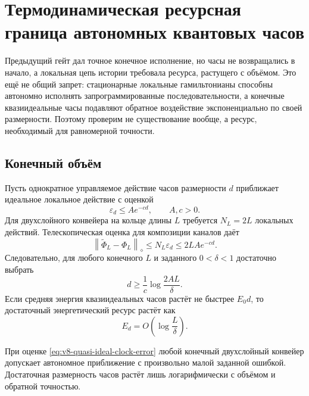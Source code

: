 \chapter{Термодинамическая ресурсная граница автономных квантовых часов}
\label{ch:v8-bounded-strength-autonomous-clock-thermodynamic-limit-gate}

Предыдущий гейт дал точное конечное исполнение, но часы не возвращались в
начало, а локальная цепь истории требовала ресурса, растущего с объёмом.
Это ещё не общий запрет: стационарные локальные гамильтонианы способны
автономно исполнять запрограммированные последовательности, а конечные
квазиидеальные часы подавляют обратное воздействие экспоненциально по своей
размерности. Поэтому проверим не существование вообще, а ресурс, необходимый
для равномерной точности.

\section{Конечный объём}

Пусть однократное управляемое действие часов размерности $d$ приближает
идеальное локальное действие с оценкой
\begin{equation}
 \varepsilon_d\leq A e^{-cd},\qquad A,c>0.
 \label{eq:v8-quasi-ideal-clock-error}
\end{equation}
Для двухслойного конвейера на кольце длины $L$ требуется $N_L=2L$
локальных действий. Телескопическая оценка для композиции каналов даёт
\begin{equation}
 \left\|\widetilde\Phi_L-\Phi_L\right\|_\diamond
 \leq N_L\varepsilon_d
 \leq 2LAe^{-cd}.
 \label{eq:v8-clock-global-error}
\end{equation}
Следовательно, для любого конечного $L$ и заданного $0<\delta<1$ достаточно
выбрать
\begin{equation}
 d\geq \frac1c\log\frac{2AL}{\delta}.
 \label{eq:v8-clock-dimension-schedule}
\end{equation}
Если средняя энергия квазиидеальных часов растёт не быстрее $E_0d$, то
достаточный энергетический ресурс растёт как
\begin{equation}
 E_d=O\!\left(\log\frac{L}{\delta}\right).
 \label{eq:v8-clock-energy-schedule}
\end{equation}

\begin{theorem}
При оценке \eqref{eq:v8-quasi-ideal-clock-error} любой конечный
двухслойный конвейер допускает автономное приближение с произвольно малой
заданной ошибкой. Достаточная размерность часов растёт лишь логарифмически
с объёмом и обратной точностью.
\end{theorem}

